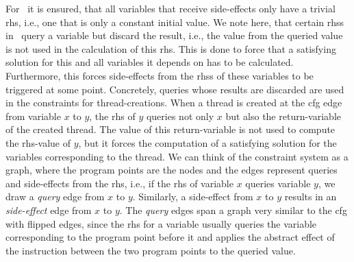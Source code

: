   For \gob\ it is ensured, that all variables that receive side-effects only have a trivial \ac{rhs}, i.e., one that is only a constant initial value.
  We note here, that certain \acp{rhs} in \gob\ query a variable but discard the result, i.e., the value from the queried value is not used in the calculation of this \ac{rhs}. This is done to force that a satisfying solution for this and all variables it depends on has to be calculated. Furthermore, this forces side-effects from the \acp{rhs} of these variables to be triggered at some point. Concretely, queries whose results are discarded are used in the constraints for thread-creations. When a thread is created at the \ac{cfg} edge from variable $x$ to $y$, the \ac{rhs} of $y$ queries not only $x$ but also the return-variable of the created thread. The value of this return-variable is not used to compute the \ac{rhs}-value of $y$, but it forces the computation of a satisfying solution for the variables corresponding to the thread.
  We can think of the constraint system as a graph, where the program points are the nodes and the edges represent queries and side-effects from the \ac{rhs}, i.e., if the \ac{rhs} of variable $x$ queries variable $y$, we draw a \textit{query} edge from $x$ to $y$. Similarly, a side-effect from $x$ to $y$ results in an \textit{side-effect} edge from $x$ to $y$. The \textit{query} edges span a graph very similar to the \ac{cfg} with flipped edges, since the \ac{rhs} for a variable usually queries the variable corresponding to the program point before it and applies the abstract effect of the instruction between the two program points to the queried value.

